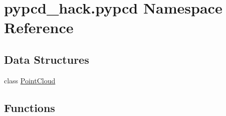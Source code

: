 \hypertarget{namespacepypcd__hack_1_1pypcd}{}\section{pypcd\+\_\+hack.\+pypcd Namespace Reference}
\label{namespacepypcd__hack_1_1pypcd}
\subsection*{Data Structures}
\begin{DoxyCompactItemize}
\item 
class \hyperlink{classpypcd__hack_1_1pypcd_1_1PointCloud}{Point\+Cloud}
\end{DoxyCompactItemize}
\subsection*{Functions}

